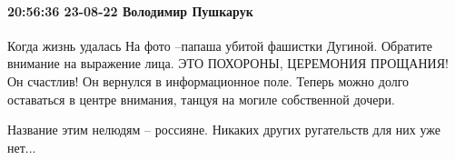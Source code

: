  
 
 
 
 

\paragraph{20:56:36 23-08-22 Володимир Пушкарук}

Когда жизнь удалась
На фото –папаша убитой фашистки Дугиной. Обратите внимание на выражение лица. ЭТО
ПОХОРОНЫ, ЦЕРЕМОНИЯ ПРОЩАНИЯ!
Он счастлив! Он вернулся в информационное поле. Теперь можно долго оставаться в
центре внимания, танцуя на могиле собственной дочери.

Название этим нелюдям – россияне. Никаких других ругательств
для них уже нет...
